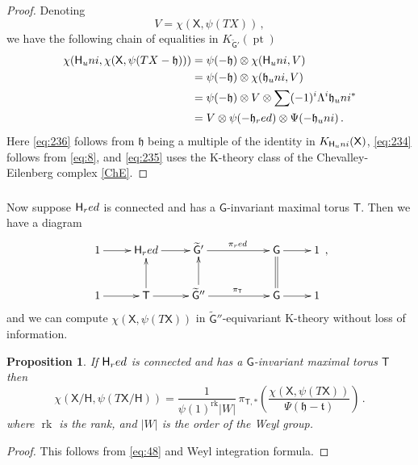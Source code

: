 \documentclass[14pt]{extarticle}
\newcommand{\bT}{\mathsf{T}}
\newcommand{\bG}{\mathsf{G}}
\newcommand{\bH}{\mathsf{H}}
\newcommand{\bX}{\mathsf{X}}
\newcommand{\ft}{\mathfrak{t}}
\newcommand{\fh}{\mathfrak{h}}
\newcommand{\uni}{\textup{uni}}
\newcommand{\red}{\textup{red}}
\DeclareMathOperator{\pt}{pt}
\DeclareMathOperator{\rk}{rk}
\newtheorem{Proposition}[Lemma]{Proposition}
\theoremstyle{definition}
\begin{document}
\begin{proof}
  Denoting
  \[
    V=\chi(\bX, \psi(TX)) \,, 
  \]
  we
  have the following chain of equalities in $K_{\widetilde{\bG}'}(\pt)$
  \begin{align}
    \chi(\bH_\uni,\chi(\bX, \psi(TX-\fh))) &= \psi(-\fh) \otimes
                                             \chi(\bH_\uni,V) \label{eq:236}\\
    &= \psi(-\fh) \otimes
                                             \chi(\fh_\uni,V) \label{eq:234}
    \\
     &= \psi(-\fh) \otimes V \otimes \sum
       (-1)^i \Lambda^i \fh_\uni^* \label{eq:235} \\
    &= V \otimes \psi(-\fh_\red) \otimes \Psi(-\fh_\uni) \notag\,. 
  \end{align}
  Here \eqref{eq:236} follows from $\fh$ being a multiple of the
  identity in $K_{\bH_\uni}(\bX)$, \eqref{eq:234} follows from
  \eqref{eq:8}, and \eqref{eq:235} uses the K-theory class of the 
  Chevalley-Eilenberg complex \eqref{ChE}. 
\end{proof}

\subsubsection{}

Now suppose $\bH_\red$ is connected and has a $\bG$-invariant maximal
torus $\bT$. Then we have a diagram
%
\begin{equation}
  \label{eq:56}
  \xymatrix{
   1 \ar[r] & \bH_\red \ar[r] & \widetilde{\bG}' \ar[rr]^{\pi_\red} && \bG \ar[r] &
   1 \\
   1 \ar[r] & \bT \ar[r] \ar[u] & \widetilde{\bG}'' \ar[rr]^{\pi_\bT} \ar[u] && \bG \ar[r] \ar@{=}[u]&
   1}\,, 
\end{equation}
%
and we can compute $\chi(\bX, \psi(
                             T \bX))$ in
                             $\widetilde{\bG}''$-equivariant
                             K-theory without loss of information. 

\begin{Proposition} If $\bH_\red$ is connected and has a $\bG$-invariant maximal
torus $\bT$ then 
%
  \begin{equation}
    \label{eq:49a}
   \chi(\bX/\bH, \psi(T \bX/\bH)) = \frac{1}{ \psi(1)^{\rk} |W|} \, \pi_{\bT,*} 
                           \left( \frac{\chi(\bX, \psi(
                             T \bX))}{\Psi(\fh-\ft)}
                           \right) 
\,. 
                         \end{equation}
where $\rk$ is the rank, and $|W|$ is the order of the Weyl group. 
\end{Proposition}
%
\begin{proof}
This follows from \eqref{eq:48} and 
Weyl integration formula. 
\end{proof}
\end{document}
